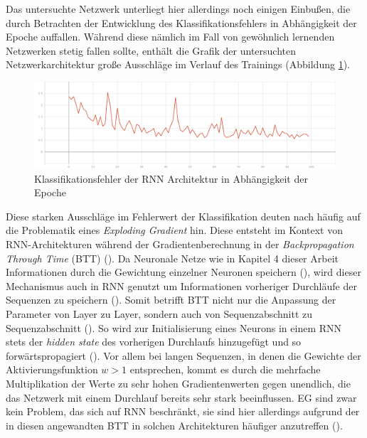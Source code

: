 Das untersuchte Netzwerk unterliegt hier allerdings noch einigen Einbußen, die durch Betrachten der Entwicklung des Klassifikationsfehlers in Abhängigkeit der Epoche auffallen. Während diese nämlich im Fall von gewöhnlich lernenden Netzwerken stetig fallen sollte, enthält die Grafik der untersuchten Netzwerkarchitektur große Ausschläge im Verlauf des Trainings (Abbildung \ref{rnn-1-loss}).

\begin{figure}[h]
    \begin{center}
        \includegraphics[scale=0.3]{grafiken/rnn-1-loss.png}
        \caption{Klassifikationsfehler der RNN Architektur in Abhängigkeit der Epoche}
        \label{rnn-1-loss}
    \end{center}
\end{figure}

Diese starken Ausschläge im Fehlerwert der Klassifikation deuten nach \cite{pascanu2013difficulty} häufig auf die Problematik eines \textit{Exploding Gradient} hin. Diese entsteht im Kontext von RNN-Architekturen während der Gradientenberechnung in der \textit{Backpropagation Through Time} (BTT) (\cite{werbos1990backpropagation}). Da Neuronale Netze wie in Kapitel 4 dieser Arbeit Informationen durch die Gewichtung einzelner Neuronen speichern (\cite{haykin2007neural}), wird dieser Mechanismus auch in RNN genutzt um Informationen vorheriger Durchläufe der Sequenzen zu speichern (\cite{werbos1990backpropagation}). Somit betrifft BTT nicht nur die Anpassung der Parameter von Layer zu Layer, sondern auch von Sequenzabschnitt zu Sequenzabschnitt (\cite{werbos1990backpropagation}). So wird zur Initialisierung eines Neurons in einem RNN stets der \textit{hidden state} des vorherigen Durchlaufs hinzugefügt und so forwärtspropagiert (\cite{pascanu2013difficulty}). Vor allem bei langen Sequenzen, in denen die Gewichte der Aktivierungsfunktion $w > 1$ entsprechen, kommt es durch die mehrfache Multiplikation der Werte zu sehr hohen Gradientenwerten gegen unendlich, die das Netzwerk mit einem Durchlauf bereits sehr stark beeinflussen. EG sind zwar kein Problem, das sich auf RNN beschränkt, sie sind hier allerdings aufgrund der in diesen angewandten BTT in solchen Architekturen häufiger anzutreffen (\cite{pascanu2013difficulty}).

